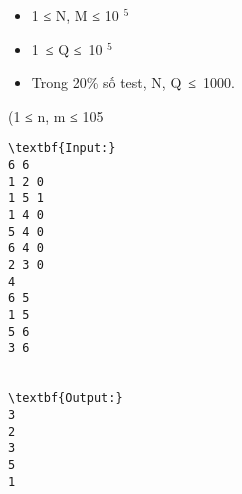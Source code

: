\begin{itemize}
	\item     1 ≤ N, M ≤ 10    $^     5    $
	\item     1 ≤ Q ≤ 10    $^     5    $
	\item     Trong 20\% số test, N, Q ≤ 1000.   
\end{itemize}     (1 ≤ n, m ≤ 105
\begin{verbatim}
\textbf{Input:}
6 6
1 2 0
1 5 1
1 4 0
5 4 0
6 4 0
2 3 0
4
6 5
1 5
5 6
3 6


\textbf{Output:}
3
2
3
5
1

\end{verbatim}